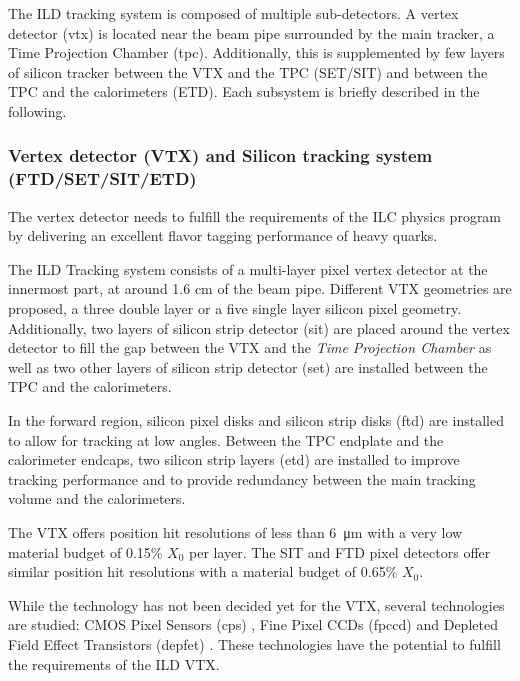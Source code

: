 The ILD tracking system is composed of multiple sub-detectors. A vertex detector (\acrshort{vtx}) is located near the beam pipe surrounded by the main tracker, a Time Projection Chamber (\acrshort{tpc}). Additionally, this is supplemented by few layers of silicon tracker between the VTX and the TPC (SET/SIT) and between the TPC and the calorimeters (ETD). Each subsystem is briefly described in the following.

\subsubsection{Vertex detector (VTX) and Silicon tracking system (FTD/SET/SIT/ETD)}

The vertex detector needs to fulfill the requirements of the ILC physics program by delivering an excellent flavor tagging performance of heavy quarks.

The ILD Tracking system consists of a multi-layer pixel vertex detector at the innermost part, at around 1.6 cm of the beam pipe. Different VTX geometries are proposed, a three double layer or a five single layer silicon pixel geometry. Additionally, two layers of silicon strip detector (\acrshort{sit}) are placed around the vertex detector to fill the gap between the VTX and the \textit{Time Projection Chamber} as well as two other layers of silicon strip detector (\acrshort{set}) are installed between the TPC and the calorimeters.

In the forward region, silicon pixel disks and silicon strip disks (\acrshort{ftd}) are installed to allow for tracking at low angles. Between the TPC endplate and the calorimeter endcaps, two silicon strip layers (\acrshort{etd}) are installed to improve tracking performance and to provide redundancy between the main tracking volume and the calorimeters.

The VTX offers position hit resolutions of less than \SI{6}{\micro\meter} \cite{ILC_TDR_Vol4} with a very low material budget of 0.15\% $X_0$ per layer. The SIT and FTD pixel detectors offer similar position hit resolutions with a material budget of 0.65\% $X_0$.

While the technology has not been decided yet for the VTX, several technologies are studied: CMOS Pixel Sensors (\acrshort{cps}) \cite{Winter:2012ms}, Fine Pixel CCDs (\acrshort{fpccd}) \cite{Murai:2016taa} and Depleted Field Effect Transistors (\acrshort{depfet}) \cite{Boronat:2016cog}. These technologies have the potential to fulfill the requirements of the ILD VTX.


